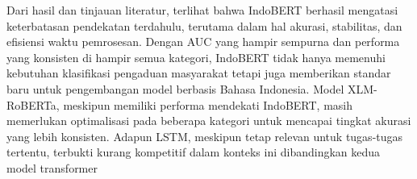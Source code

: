\documentclass[12pt,a4paper]{article}
\begin{document}
\begin{adjustwidth}{3em}{0pt}
    \hspace{0.5cm} Dari hasil dan tinjauan literatur, terlihat bahwa IndoBERT berhasil mengatasi keterbatasan pendekatan terdahulu, terutama dalam hal akurasi, stabilitas, dan efisiensi waktu pemrosesan. Dengan AUC yang hampir sempurna dan performa yang konsisten di hampir semua kategori, IndoBERT tidak hanya memenuhi kebutuhan klasifikasi pengaduan masyarakat tetapi juga memberikan standar baru untuk pengembangan model berbasis Bahasa Indonesia. Model XLM-RoBERTa, meskipun memiliki performa mendekati IndoBERT, masih memerlukan optimalisasi pada beberapa kategori untuk mencapai tingkat akurasi yang lebih konsisten. Adapun LSTM, meskipun tetap relevan untuk tugas-tugas tertentu, terbukti kurang kompetitif dalam konteks ini dibandingkan kedua model transformer
\end{adjustwidth}















\newpage
\end{document}
